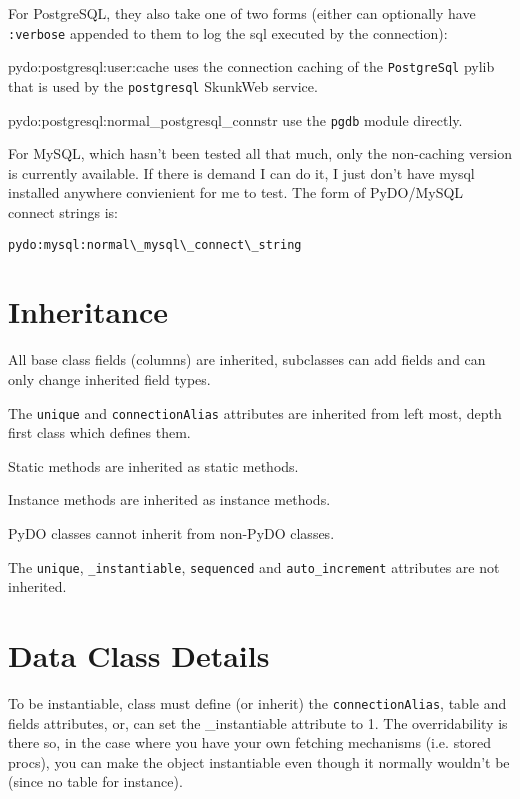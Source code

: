 \documentclass[titlepage]{manual}
\begin{document}
For PostgreSQL, they also take one of two forms (either can optionally
have \texttt{:verbose} appended to them to log the sql executed by the
connection): 
\begin{argdesc}
\item[pydo:postgresql:user:cache] uses the connection caching of the
\texttt{PostgreSql} pylib that is used by the \texttt{postgresql}
SkunkWeb service.
\item[pydo:postgresql:normal_postgresql\_connstr] use the \texttt{pgdb}
module directly.
\end{argdesc}

For MySQL, which hasn't been tested all that much, only the non-caching
version is currently available.  If there is demand I can do it, I just
don't have mysql installed anywhere convienient for me to test.
The form of PyDO/MySQL connect strings is:
\begin{verbatim}
pydo:mysql:normal\_mysql\_connect\_string
\end{verbatim}

\section{Inheritance}
All base class fields (columns) are inherited, subclasses can add fields 
and can only change inherited field types.

The \texttt{unique} and \texttt{connectionAlias} attributes are
inherited from left most, depth first class which defines them.

Static methods are inherited as static methods.

Instance methods are inherited as instance methods.

PyDO classes cannot inherit from non-PyDO classes.

The \texttt{unique}, \texttt{_instantiable}, \texttt{sequenced} and
\texttt{auto_increment} attributes are not inherited.



\section{Data Class Details}
To be instantiable, class must define (or inherit) the
\texttt{connectionAlias}, table and fields attributes, or, can set the
_instantiable attribute to 1.  The overridability is there so, in the
case where you have your own fetching mechanisms (i.e. stored procs),
you can make the object instantiable even though it normally wouldn't
be (since no table for instance).
\end{document}
